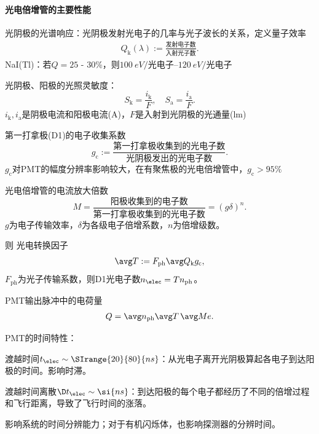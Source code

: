 \paragraph{光电倍增管的主要性能}
\begin{compactitem}
	\item 光阴极的光谱响应：光阴极发射光电子的几率与光子波长的关系，定义量子效率
	\begin{align}
		Q_\mathrm k(\lambda):=\frac{\text{发射电子数}}{\text{入射光子数}}.
	\end{align}
	NaI(Tl)：若$Q=25$ - 30\%，则$\SIrange{100}{120}{eV/\text{光电子}}$
	\item 光阴极、阳极的光照灵敏度：
	\[
		S_\mathrm k=\frac{i_\mathrm k}F,\quad S_\mathrm a=\frac{i_\mathrm a}F.
	\]
	$i_\mathrm k,i_\mathrm a$是阴极电流和阳极电流(A)，$F$是入射到光阴极的光通量(lm)
	\item 第一打拿极(D1)的电子收集系数
	\[
		g_\mathrm c:=\frac{\text{第一打拿极收集到的光电子数}}{\text{光阴极发出的光电子数}}.
	\]
	$g_\mathrm c$对PMT的幅度分辨率影响较大，在有聚焦极的光电倍增管中，$g_\mathrm c>95\%$
	\item 光电倍增管的电流放大倍数
	\[
		M=\frac{\text{阳极收集到的电子数}}{\text{第一打拿极收集到的光电子数}}=(g\delta)^n.
	\]
	$g$为电子传输效率，$\delta$为各级电子倍增系数，$n$为倍增级数。
\end{compactitem}
则%
光电转换因子
\[
	\avg T:=F_{\mathrm{ph}}\avg Q_\mathrm kg_\mathrm c,
\]
$F_{\mathrm{ph}}$为光子传输系数，则D1光电子数$n_\elec=Tn_{\mathrm{ph}}$。

PMT输出脉冲中的电荷量
\begin{align}
	Q=\avg n_{\mathrm{ph}}\avg T\,\avg Me.
\end{align}
\begin{compactitem}
	\item PMT的时间特性：
	\begin{compactitem}
		\item 渡越时间$t_\elec\sim\SIrange{20}{80}{ns}$：从光电子离开光阴极算起各电子到达阳极的时间。影响时滞。
		\item 渡越时间离散$\D t_\elec\sim\si{ns}$：到达阳极的每个电子都经历了不同的倍增过程和飞行距离，导致了飞行时间的涨落。
		
		影响系统的时间分辨能力；对于有机闪烁体，也影响探测器的分辨时间。
	\end{compactitem}
\end{compactitem}


